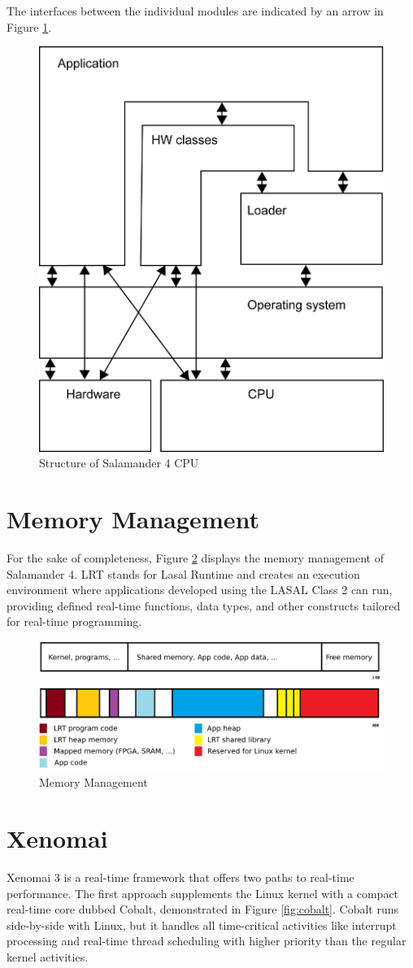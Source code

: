 \documentclass[MMR,Master,english]{twbook}
\begin{document}
\clearpage
\noindent The interfaces between the individual modules are indicated by an arrow in Figure \ref{fig:lasal_cpu}.

\begin{figure}[H]
	\centering
	\includegraphics[width=0.5\columnwidth]{img/Software-Struktur_einer_LASAL_CPU.png}
	\caption[Structure of Salamander 4 CPU]{Structure of Salamander 4 CPU}
	\label{fig:lasal_cpu}
\end{figure}

\section{Memory Management}
\noindent For the sake of completeness, Figure \ref{fig:memory_management} displays the memory management of Salamander 4. LRT stands for Lasal Runtime and creates an execution environment where applications developed using the LASAL Class 2 can run, providing defined real-time functions, data types, and other constructs tailored for real-time programming.

\begin{figure}[H]
	\centering
	\includegraphics[width=0.8\columnwidth]{img/RAM_Memory_management.png}
	\caption[Memory Management]{Memory Management}
	\label{fig:memory_management}
\end{figure}

\clearpage
\section{Xenomai}
\noindent Xenomai 3 \cite{XenomaiXenomai} is a real-time framework that offers two paths to real-time performance. The first approach supplements the Linux kernel with a compact real-time core dubbed Cobalt, demonstrated in Figure \ref{fig:cobalt}. Cobalt runs side-by-side with Linux, but it handles all time-critical activities like interrupt processing and real-time thread scheduling with higher priority than the regular kernel activities. 
\end{document}
